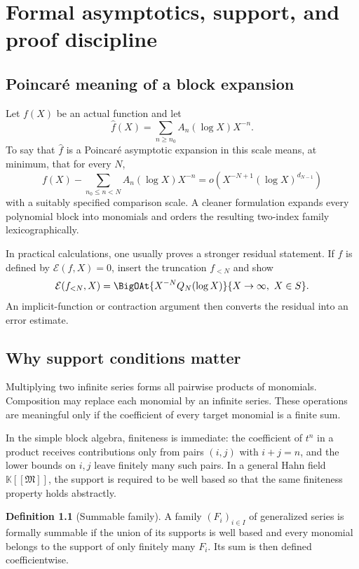 \documentclass[11pt,openany]{book}
\theoremstyle{definition}
\newtheorem{definition}{Definition}[chapter]
\theoremstyle{plain}
\theoremstyle{remark}
\newcommand{\K}{\mathbb{K}}
\newcommand{\FormalAsymptoticExpansionOf}[1]{\widehat{#1}}
\newcommand{\M}{\mathfrak{M}}
\begin{document}
\chapter{Formal asymptotics, support, and proof discipline}\label{ch:support}

\section{Poincar\'e meaning of a block expansion}
Let \(f(X)\) be an actual function and let
\[
 \FormalAsymptoticExpansionOf{f}(X)=\sum_{n\ge n_0}A_n(\log X)X^{-n}.
\]
To say that \(\FormalAsymptoticExpansionOf{f}\) is a Poincar\'e asymptotic expansion in this scale means, at minimum, that for every \(N\),
\begin{equation}\label{eq:block-asymptotic}
 f(X)-\sum_{n_0\le n<N}A_n(\log X)X^{-n}
 =o\!\left(X^{-N+1}(\log X)^{d_{N-1}}\right)
\end{equation}
with a suitably specified comparison scale. A cleaner formulation expands every polynomial block into monomials and orders the resulting two-index family lexicographically.

In practical calculations, one usually proves a stronger residual statement. If \(f\) is defined by \(\mathcal E(f,X)=0\), insert the truncation \(f_{<N}\) and show
\[
 \mathcal E(f_{<N},X)
 =\BigOAt{X^{-N}Q_N(\log X)}{X\to\infty,\ X\in S}.
\]
An implicit-function or contraction argument then converts the residual into an error estimate.

\section{Why support conditions matter}
Multiplying two infinite series forms all pairwise products of monomials. Composition may replace each monomial by an infinite series. These operations are meaningful only if the coefficient of every target monomial is a finite sum.

In the simple block algebra, finiteness is immediate: the coefficient of \(t^n\) in a product receives contributions only from pairs \((i,j)\) with \(i+j=n\), and the lower bounds on \(i,j\) leave finitely many such pairs. In a general Hahn field \(\K[[\M]]\), the support is required to be well based so that the same finiteness property holds abstractly.

\begin{definition}[Summable family]
A family \((F_i)_{i\in I}\) of generalized series is formally summable if the union of its supports is well based and every monomial belongs to the support of only finitely many \(F_i\). Its sum is then defined coefficientwise.
\end{definition}
\end{document}
